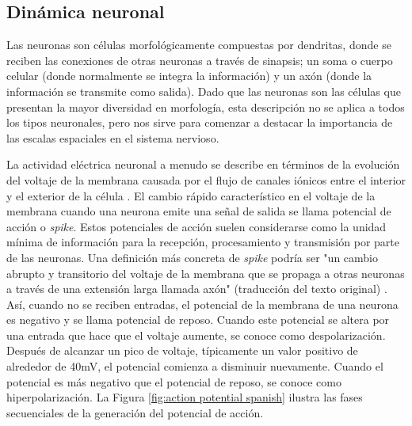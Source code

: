 \subsection{Dinámica neuronal}
Las neuronas son células morfológicamente compuestas por dendritas, donde se reciben las conexiones de otras neuronas a través de sinapsis; un soma o cuerpo celular (donde normalmente se integra la información) y un axón (donde la información se transmite como salida). Dado que las neuronas son las células que presentan la mayor diversidad en morfología, esta descripción no se aplica a todos los tipos neuronales, pero nos sirve para comenzar a destacar la importancia de las escalas espaciales en el sistema nervioso.

La actividad eléctrica neuronal a menudo se describe en términos de la evolución del voltaje de la membrana causada por el flujo de canales iónicos entre el interior y el exterior de la célula \parencite{kandel_principles_2012}. El cambio rápido característico en el voltaje de la membrana cuando una neurona emite una señal de salida se llama potencial de acción o \textit{spike}. Estos potenciales de acción suelen considerarse como la unidad mínima de información para la recepción, procesamiento y transmisión por parte de las neuronas. Una definición más concreta de \textit{spike} podría ser "un cambio abrupto y transitorio del voltaje de la membrana que se propaga a otras neuronas a través de una extensión larga llamada axón" (traducción del texto original) \parencite{izhikevich_dynamical_2007}. Así, cuando no se reciben entradas, el potencial de la membrana de una neurona es negativo y se llama potencial de reposo. Cuando este potencial se altera por una entrada que hace que el voltaje aumente, se conoce como despolarización. Después de alcanzar un pico de voltaje, típicamente un valor positivo de alrededor de 40mV, el potencial comienza a disminuir nuevamente. Cuando el potencial es más negativo que el potencial de reposo, se conoce como hiperpolarización. La Figura \ref{fig:action potential spanish} ilustra las fases secuenciales de la generación del potencial de acción.

